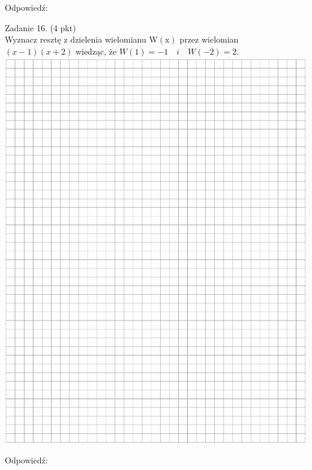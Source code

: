 \documentclass[10pt]{article}
\begin{document}
Odpowiedź:

Zadanie 16. (4 pkt)\\
Wyznacz resztę z dzielenia wielomianu \(\mathrm{W}(\mathrm{x})\) przez wielomian \((x-1)(x+2)\) wiedząc, że \(W(1)=-1 \quad i \quad W(-2)=2\).\\
\includegraphics[max width=\textwidth, center]{2024_11_21_caad0d2d07cc5c30818fg-14}

Odpowiedź:
\end{document}

